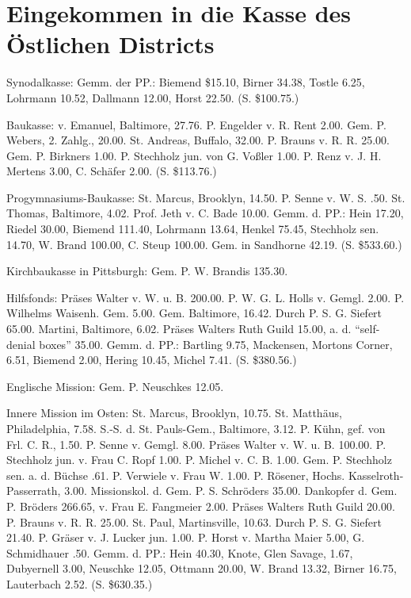 \chapter[Kasse des Östlichen Districts]{Eingekommen in die Kasse des Östlichen Districts}

Synodalkasse: Gemm. der PP.: Biemend \$15.10, Birner 34.38, Tostle 6.25, Lohrmann 10.52, Dallmann 12.00, Horst 22.50. (S. \$100.75.)

Baukasse: v. Emanuel, Baltimore, 27.76. P. Engelder v. R. Rent 2.00. Gem. P. Webers, 2. Zahlg., 20.00. St. Andreas, Buffalo, 32.00. P. Brauns v. R. R. 25.00. Gem. P. Birkners 1.00. P. Stechholz jun. von G. Voßler 1.00. P. Renz v. J. H. Mertens 3.00, C. Schäfer 2.00. (S. \$113.76.)

Progymnasiums-Baukasse: St. Marcus, Brooklyn, 14.50. P. Senne v. W. S. .50. St. Thomas, Baltimore, 4.02. Prof. Jeth v. C. Bade 10.00. Gemm. d. PP.: Hein 17.20, Riedel 30.00, Biemend 111.40, Lohrmann 13.64, Henkel 75.45, Stechholz sen. 14.70, W. Brand 100.00, C. Steup 100.00. Gem. in Sandhorne 42.19. (S. \$533.60.)

Kirchbaukasse in Pittsburgh: Gem. P. W. Brandis 135.30.

Hilfsfonds: Präses Walter v. W. u. B. 200.00. P. W. G. L. Holls v. Gemgl. 2.00. P. Wilhelms Waisenh. Gem. 5.00. Gem. Baltimore, 16.42. Durch P. S. G. Siefert 65.00. Martini, Baltimore, 6.02. Präses Walters Ruth Guild 15.00, a. d. “self-denial boxes” 35.00. Gemm. d. PP.: Bartling 9.75, Mackensen, Mortons Corner, 6.51, Biemend 2.00, Hering 10.45, Michel 7.41. (S. \$380.56.)

Englische Mission: Gem. P. Neuschkes 12.05.

Innere Mission im Osten: St. Marcus, Brooklyn, 10.75. St. Matthäus, Philadelphia, 7.58. S.-S. d. St. Pauls-Gem., Baltimore, 3.12. P. Kühn, gef. von Frl. C. R., 1.50. P. Senne v. Gemgl. 8.00. Präses Walter v. W. u. B. 100.00. P. Stechholz jun. v. Frau C. Ropf 1.00. P. Michel v. C. B. 1.00. Gem. P. Stechholz sen. a. d. Büchse .61. P. Verwiele v. Frau W. 1.00. P. Rösener, Hochs. Kasselroth-Passerrath, 3.00. Missionskol. d. Gem. P. S. Schröders 35.00. Dankopfer d. Gem. P. Bröders 266.65, v. Frau E. Fangmeier 2.00. Präses Walters Ruth Guild 20.00. P. Brauns v. R. R. 25.00. St. Paul, Martinsville, 10.63. Durch P. S. G. Siefert 21.40. P. Gräser v. J. Lucker jun. 1.00. P. Horst v. Martha Maier 5.00, G. Schmidhauer .50. Gemm. d. PP.: Hein 40.30, Knote, Glen Savage, 1.67, Dubyernell 3.00, Neuschke 12.05, Ottmann 20.00, W. Brand 13.32, Birner 16.75, Lauterbach 2.52. (S. \$630.35.)


